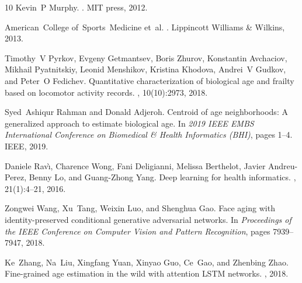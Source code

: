 \documentclass[unnumsec,webpdf,modern,large]{oup-authoring-template}
\theoremstyle{thmstyleone}%
\theoremstyle{thmstyletwo}%
\theoremstyle{thmstylethree}%
\begin{document}
\begin{thebibliography}{10}
Kevin~P Murphy.
.
\newblock MIT press, 2012.

American~College of~Sports~Medicine et~al.
.
\newblock Lippincott Williams \& Wilkins, 2013.

Timothy~V Pyrkov, Evgeny Getmantsev, Boris Zhurov, Konstantin Avchaciov, Mikhail Pyatnitskiy, Leonid Menshikov, Kristina Khodova, Andrei~V Gudkov, and Peter~O Fedichev.
\newblock Quantitative characterization of biological age and frailty based on locomotor activity records.
, 10(10):2973, 2018.

Syed~Ashiqur Rahman and Donald Adjeroh.
\newblock Centroid of age neighborhoods: A generalized approach to estimate biological age.
\newblock In {\em 2019 IEEE EMBS International Conference on Biomedical \& Health Informatics (BHI)}, pages 1--4. IEEE, 2019.

Daniele Rav{\`\i}, Charence Wong, Fani Deligianni, Melissa Berthelot, Javier Andreu-Perez, Benny Lo, and Guang-Zhong Yang.
\newblock Deep learning for health informatics.
, 21(1):4--21, 2016.

Zongwei Wang, Xu~Tang, Weixin Luo, and Shenghua Gao.
\newblock Face aging with identity-preserved conditional generative adversarial networks.
\newblock In {\em Proceedings of the IEEE Conference on Computer Vision and Pattern Recognition}, pages 7939--7947, 2018.

Ke~Zhang, Na~Liu, Xingfang Yuan, Xinyao Guo, Ce~Gao, and Zhenbing Zhao.
\newblock Fine-grained age estimation in the wild with attention {LSTM} networks.
, 2018.

\end{thebibliography}

%
%

%
%
\end{document}
